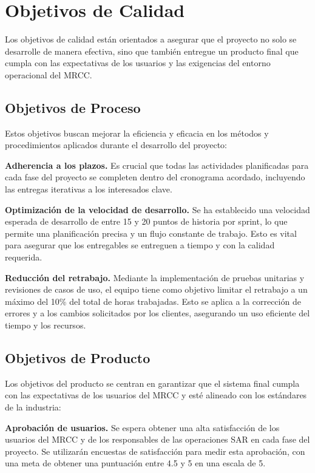 \section{Objetivos de Calidad}\label{sec:ojetivosDeCalidad}

Los objetivos de calidad están orientados a asegurar que el proyecto no solo se desarrolle de manera efectiva, 
sino que también entregue un producto final que cumpla con las expectativas de los usuarios y las exigencias del 
entorno operacional del MRCC.

\subsection{Objetivos de Proceso}

Estos objetivos buscan mejorar la eficiencia y eficacia en los métodos y procedimientos aplicados durante el desarrollo del proyecto:

\textbf{Adherencia a los plazos.} Es crucial que todas las actividades planificadas para cada fase del proyecto se completen dentro 
del cronograma acordado, incluyendo las entregas iterativas a los interesados clave.

\textbf{Optimización de la velocidad de desarrollo.} Se ha establecido una velocidad esperada de desarrollo de entre 15 y 20 puntos de historia por sprint,
lo que permite una planificación precisa y un flujo constante de trabajo. Esto es vital para asegurar que los entregables se entreguen a tiempo y con la calidad requerida.


\textbf{Reducción del retrabajo.} Mediante la implementación de pruebas unitarias y revisiones de casos de uso, el equipo tiene como objetivo 
limitar el retrabajo a un máximo del 10\% del total de horas trabajadas. Esto se aplica a la corrección de errores y a los cambios solicitados 
por los clientes, asegurando un uso eficiente del tiempo y los recursos.


\subsection{Objetivos de Producto}

Los objetivos del producto se centran en garantizar que el sistema final cumpla con las expectativas de los usuarios del MRCC y esté alineado 
con los estándares de la industria:

\textbf{Aprobación de usuarios.} Se espera obtener una alta satisfacción de los usuarios del MRCC y de los responsables de las operaciones SAR 
en cada fase del proyecto. Se utilizarán encuestas de satisfacción para medir esta aprobación, con una meta de obtener una puntuación entre 4.5 
y 5 en una escala de 5.

